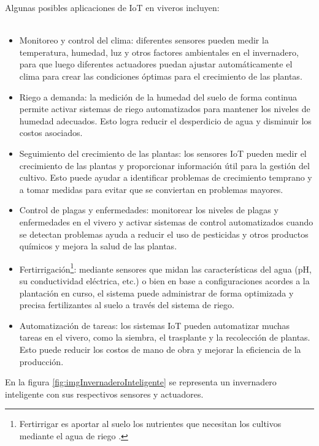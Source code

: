 Algunas posibles aplicaciones de IoT en viveros incluyen:
\\
\\
\begin{itemize}
	\item Monitoreo y control del clima: diferentes sensores pueden medir la temperatura, humedad, luz y otros factores ambientales en el invernadero, para que luego diferentes actuadores puedan ajustar automáticamente el clima para crear las condiciones óptimas para el crecimiento de las plantas.

    \item Riego a demanda: la medición de la humedad del suelo de forma continua permite activar sistemas de riego automatizados para mantener los niveles de humedad adecuados. Esto logra reducir el desperdicio de agua y disminuir los costos asociados.

    \item Seguimiento del crecimiento de las plantas: los sensores IoT pueden medir el crecimiento de las plantas y proporcionar información útil para la gestión del cultivo. Esto puede ayudar a identificar problemas de crecimiento temprano y a tomar medidas para evitar que se conviertan en problemas mayores.

    \item Control de plagas y enfermedades: monitorear los niveles de plagas y enfermedades en el vivero y activar sistemas de control automatizados cuando se detectan problemas ayuda a reducir el uso de pesticidas y otros productos químicos y mejora la salud de las plantas.
    
   \item  Fertirrigación\footnote{Fertirrigar es aportar al suelo los nutrientes que necesitan los cultivos mediante el agua de riego \citep{mapa:1}.}: mediante sensores que midan las características del agua (pH, su conductividad eléctrica, etc.) o bien en base a configuraciones acordes a la plantación en curso, el sistema puede administrar de forma optimizada y precisa fertilizantes al suelo a través del sistema de riego.

    \item Automatización de tareas: los sistemas IoT pueden automatizar muchas tareas en el vivero, como la siembra, el trasplante y la recolección de plantas. Esto puede reducir los costos de mano de obra y mejorar la eficiencia de la producción.
\end{itemize}    

En la figura \ref{fig:imgInvernaderoInteligente} se representa un invernadero inteligente con sus respectivos sensores y actuadores.

